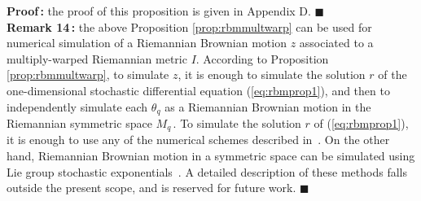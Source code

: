 \documentclass{svmult}
\begin{document}
\textbf{Proof\,:} the proof of this proposition is given in Appendix D. \hfill$\blacksquare$ \\[0.1cm]
\textbf{Remark 14\,:} the above Proposition \ref{prop:rbmmultwarp} can be used for numerical simulation of a Riemannian Brownian motion $z$ associated to a multiply-warped Riemannian metric $I$. According to Proposition \ref{prop:rbmmultwarp}, to simulate $z$, it is enough to simulate the solution $r$ of the one-dimensional stochastic differential equation (\ref{eq:rbmprop1}), and then to independently simulate each $\theta_q$ as a Riemannian Brownian motion in the Riemannian symmetric space $M_q\,$. To simulate the solution $r$ of (\ref{eq:rbmprop1}), it is enough to use any of the numerical schemes described in~\cite{platen}. On the other hand, Riemannian Brownian motion in a symmetric space can be simulated using Lie group stochastic exponentials~\cite{liao,arnaudon,estrade}. A detailed description of these methods falls outside the present scope, and is reserved for future work. \hfill $\blacksquare$
     

\end{document}
